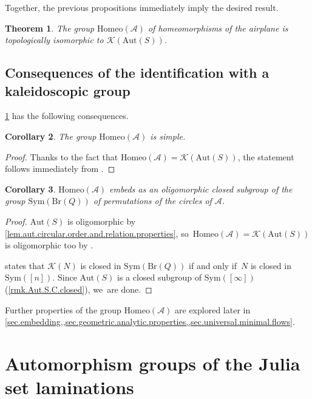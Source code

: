 \documentclass[JEP,XML,SOM,Unicode,NoFloatCountersInSection,published]{cedram}
\theoremstyle{plain}
\newtheorem{theorem}{Theorem}[section]
\newtheorem{corollary}[theorem]{Corollary}
\theoremstyle{definition}
\theoremstyle{remark}
\newcommand{\Aut}{\mathrm{Aut}}
\newcommand{\Sym}{\mathrm{Sym}}
\newcommand{\Homeo}{\mathrm{Homeo}}
\newcommand{\A}{\mathcal{A}}
\newcommand{\K}{\mathcal{K}}
\newcommand{\Br}{\mathrm{Br}}
\begin{document}
Together, the previous propositions immediately imply the desired result.

\begin{theorem}
\label{thm.homeo.airplane.is.kaleidoscopic}
The group $\Homeo(\A)$ of homeomorphisms of the airplane is topologically isomorphic to $\K(\Aut(S))$.
\end{theorem}

\subsection{Consequences of the identification with a kaleidoscopic group}

\cref{thm.homeo.airplane.is.kaleidoscopic} has the following consequences.\enlargethispage{.5\baselineskip}

\begin{corollary}
\label{cor.airplane.simple}
The group $\Homeo(\A)$ is simple.
\end{corollary}

\begin{proof}
Thanks to the fact that $\Homeo(\A) = \K(\Aut(S))$, the statement follows immediately from \cite[Th.\,1.1]{Kaleidoscopic}.
\end{proof}

\begin{corollary}
\label{cor.airplane.group.closed.oligomorphic}
$\Homeo(\A)$ embeds as an oligomorphic closed subgroup of the group $\Sym(\Br(Q))$ of permutations of the circles of $\A$.
\end{corollary}

\begin{proof}
$\Aut(S)$ is oligomorphic by \cref{lem.aut.circular.order.and.relation.properties}, so~$\Homeo(\A) = \K(\Aut(S))$ is oligomorphic too by \cite[Th.\,1.4]{Kaleidoscopic}.

\cite[Th.\,1.9]{Kaleidoscopic} states that $\K(N)$ is closed in $\Sym(\Br(Q))$ if and only if~$N$ is closed in $\Sym([n])$.
Since $\Aut(S)$ is a closed subgroup of $\Sym([\infty])$ (\cref{rmk.Aut.S.C.closed}), we~are done.
\end{proof}

Further properties of the group $\Homeo(\A)$ are explored later in \cref{sec.embedding,,sec.geometric.analytic.properties,,sec.universal.minimal.flows}.

\section{Automorphism groups of the Julia set laminations}
\label{sec.lamination.automorphisms}
\end{document}
